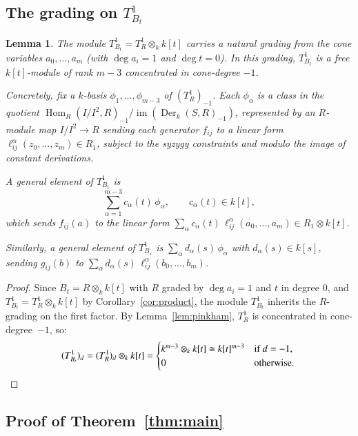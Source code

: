 \documentclass[11pt,twoside]{amsart}
\theoremstyle{plain}
\numberwithin{equation}{section}
\newtheorem{lemma}[theorem]{Lemma}
\DeclareMathOperator{\Der}{Der}
\DeclareMathOperator{\im}{im}
\theoremstyle{definition}
\newcommand{\Hom}{\operatorname{Hom}}
\begin{document}
\subsection{The grading on $T^1_{B_t}$}
 
\begin{lemma}\label{lem:grading}
The module $T^1_{B_t} = T^1_R \otimes_k k[t]$ carries a natural grading from the cone variables $a_0, \ldots, a_m$ (with $\deg a_i = 1$ and $\deg t = 0$). In this grading, $T^1_{B_t}$ is a free $k[t]$-module of rank $m - 3$ concentrated in cone-degree $-1$.
 
Concretely, fix a $k$-basis $\phi_1, \ldots, \phi_{m-3}$ of $(T^1_R)_{-1}$. Each $\phi_\alpha$ is a class in the quotient $\Hom_R(I/I^2, R)_{-1} / \im(\Der_k(S,R)_{-1})$, represented by an $R$-module map $I/I^2 \to R$ sending each generator $f_{ij}$ to a linear form $\ell^\alpha_{ij}(z_0, \ldots, z_m) \in R_1$, subject to the syzygy constraints and modulo the image of constant derivations.
 
A general element of $T^1_{B_t}$ is
\[
\sum_{\alpha=1}^{m-3} c_\alpha(t)\, \phi_\alpha, \qquad c_\alpha(t) \in k[t],
\]
which sends $f_{ij}(a)$ to the linear form $\sum_\alpha c_\alpha(t)\, \ell^\alpha_{ij}(a_0, \ldots, a_m) \in R_1 \otimes k[t]$.
 
Similarly, a general element of $T^1_{B_s}$ is $\sum_\alpha d_\alpha(s)\, \phi_\alpha$ with $d_\alpha(s) \in k[s]$, sending $g_{ij}(b)$ to $\sum_\alpha d_\alpha(s)\, \ell^\alpha_{ij}(b_0, \ldots, b_m)$.
\end{lemma}
 
\begin{proof}
Since $B_t = R \otimes_k k[t]$ with $R$ graded by $\deg a_i = 1$ and $t$ in degree $0$, and $T^1_{B_t} = T^1_R \otimes_k k[t]$ by Corollary~\ref{cor:product}, the module $T^1_{B_t}$ inherits the $R$-grading on the first factor. By Lemma~\ref{lem:pinkham}, $T^1_R$ is concentrated in cone-degree~$-1$, so:
\[
(T^1_{B_t})_d = (T^1_R)_d \otimes_k k[t] = \begin{cases} k^{m-3} \otimes_k k[t] \cong k[t]^{m-3} & \text{if } d = -1, \\ 0 & \text{otherwise.} \end{cases} \qedhere
\]
\end{proof}
 
\subsection{Proof of Theorem~\ref{thm:main}}
 
\end{document}
